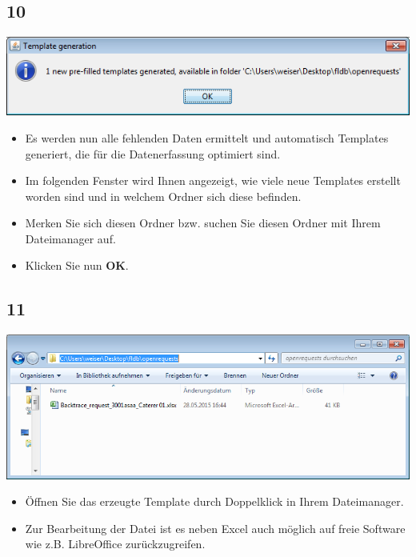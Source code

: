 \documentclass{beamer}
\begin{document}
\subsection{10}
\begin{frame}
	\begin{center}
  		\includegraphics[height=0.2\textheight]{10.png}
	\end{center}
	\begin{itemize}
		\item Es werden nun alle fehlenden Daten ermittelt und automatisch Templates generiert, die für die Datenerfassung optimiert sind.
		\item Im folgenden Fenster wird Ihnen angezeigt, wie viele neue Templates erstellt worden sind und in welchem Ordner sich diese befinden.
		\item Merken Sie sich diesen Ordner bzw. suchen Sie diesen Ordner mit Ihrem Dateimanager auf.
		\item Klicken Sie nun \textbf{OK}.
	\end{itemize}
\end{frame}

\subsection{11}
\begin{frame}
	\begin{center}
  		\includegraphics[height=0.4\textheight]{11.png}
	\end{center}
	\begin{itemize}
		\item Öffnen Sie das erzeugte Template durch Doppelklick in Ihrem Dateimanager.
		\item Zur Bearbeitung der Datei ist es neben Excel auch möglich auf freie Software wie z.B. LibreOffice zurückzugreifen.
	\end{itemize}
\end{frame}
\end{document}
